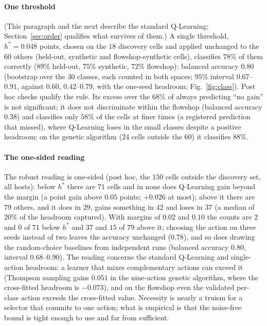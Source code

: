 \paragraph{One threshold} (This paragraph and the next describe the standard Q-Learning; Section~\ref{sec:order} qualifies what survives of them.) A single threshold, $h^*=0.048$ points, chosen on the $18$ discovery cells and applied unchanged to the $60$ others (held-out, synthetic and flowshop-synthetic cells), classifies $78\%$ of them correctly ($89\%$ held-out, $75\%$ synthetic, $72\%$ flowshop): balanced accuracy $0.80$ (bootstrap over the $30$ classes, each counted in both spaces; $95\%$ interval $0.67$--$0.91$, against $0.60$, $0.42$--$0.79$, with the one-seed headroom; Fig.~\ref{fig:class}). Post hoc checks qualify the rule. Its excess over the $68\%$ of always predicting ``no gain'' is not significant; it does not discriminate within the flowshop (balanced accuracy $0.38$) and classifies only $58\%$ of the cells at finer times (a registered prediction that missed), where Q-Learning loses in the small classes despite a positive headroom; on the genetic algorithm ($24$ cells outside the $60$) it classifies $88\%$.

\paragraph{The one-sided reading} The robust reading is one-sided (post hoc, the $150$ cells outside the discovery set, all hosts): below $h^*$ there are $71$ cells and in none does Q-Learning gain beyond the margin (a point gain above $0.05$ points; $+0.026$ at most); above it there are $79$ others, and it does in $29$, gains something in $42$ and loses in $37$ (a median of $20\%$ of the headroom captured). With margins of $0.02$ and $0.10$ the counts are $2$ and $0$ of $71$ below $h^*$ and $37$ and $15$ of $79$ above it; choosing the action on three seeds instead of two leaves the accuracy unchanged ($0.78$), and so does drawing the random-choice baselines from independent runs (balanced accuracy $0.80$, interval $0.68$--$0.90$). The reading concerns the standard Q-Learning and single-action headroom: a learner that mixes complementary actions can exceed it (Thompson sampling gains $0.051$ in the nine-action genetic algorithm, where the cross-fitted headroom is $-0.073$), and on the flowshop even the validated per-class action exceeds the cross-fitted value. Necessity is nearly a truism for a selector that commits to one action; what is empirical is that the noise-free bound is tight enough to use and far from sufficient.

